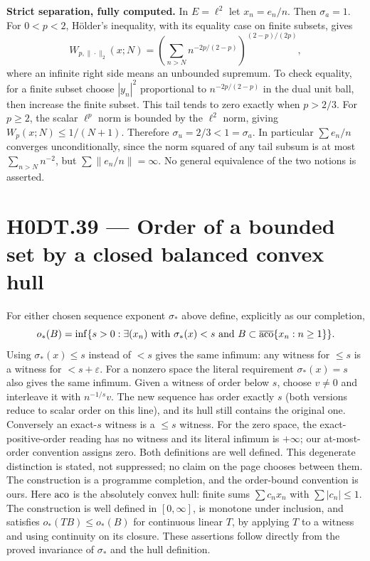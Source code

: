 \textbf{Strict separation, fully computed.} In $E=\ell^2$ let $x_n=e_n/n$. Then $\sigma_a=1$. For $0<p<2$, H\"older's inequality, with its equality case on finite subsets, gives
\[
 W_{p,\|\cdot\|_2}(x;N)=
 \left(\sum_{n>N}n^{-2p/(2-p)}\right)^{(2-p)/(2p)},
\]
where an infinite right side means an unbounded supremum. To check equality, for a finite subset choose $|y_n|^2$ proportional to $n^{-2p/(2-p)}$ in the dual unit ball, then increase the finite subset. This tail tends to zero exactly when $p>2/3$. For $p\ge2$, the scalar $\ell^p$ norm is bounded by the $\ell^2$ norm, giving $W_p(x;N)\le1/(N+1)$. Therefore $\sigma_u=2/3<1=\sigma_a$. In particular $\sum e_n/n$ converges unconditionally, since the norm squared of any tail subsum is at most $\sum_{n>N}n^{-2}$, but $\sum\|e_n/n\|=\infty$. No general equivalence of the two notions is asserted.

\section*{H0DT.39 --- Order of a bounded set by a closed balanced convex hull}
For either chosen sequence exponent $\sigma_*$ above define, explicitly as our completion,
\[
 o_*(B)=\inf\{s>0:\exists(x_n)\text{ with }\sigma_*(x)<s
 \text{ and }B\subset\overline{\operatorname{aco}}\{x_n:n\ge1\}\}.
\]
Using $\sigma_*(x)\le s$ instead of $<s$ gives the same infimum: any witness for $\le s$ is a witness for $<s+\varepsilon$. For a nonzero space the literal requirement $\sigma_*(x)=s$ also gives the same infimum. Given a witness of order below $s$, choose $v\ne0$ and interleave it with $n^{-1/s}v$. The new sequence has order exactly $s$ (both versions reduce to scalar order on this line), and its hull still contains the original one. Conversely an exact-$s$ witness is a $\le s$ witness. For the zero space, the exact-positive-order reading has no witness and its literal infimum is $+\infty$; our at-most-order convention assigns zero. Both definitions are well defined. This degenerate distinction is stated, not suppressed; no claim on the page chooses between them. The construction is a programme completion, and the order-bound convention is ours. Here $\operatorname{aco}$ is the absolutely convex hull: finite sums $\sum c_nx_n$ with $\sum|c_n|\le1$. The construction is well defined in $[0,\infty]$, is monotone under inclusion, and satisfies $o_*(TB)\le o_*(B)$ for continuous linear $T$, by applying $T$ to a witness and using continuity on its closure. These assertions follow directly from the proved invariance of $\sigma_*$ and the hull definition.

